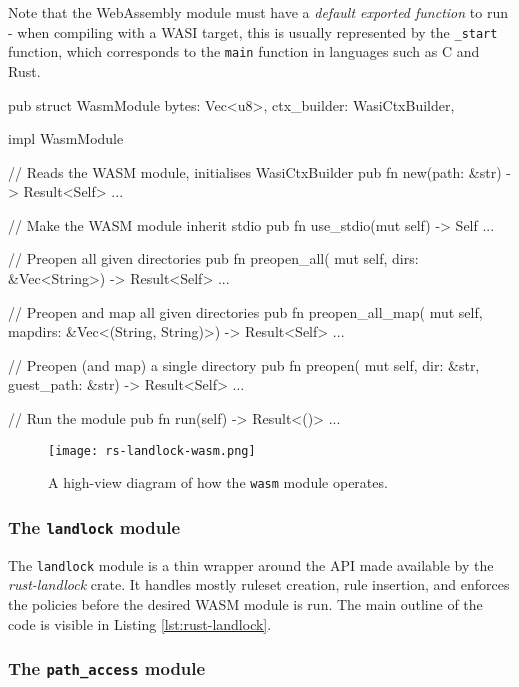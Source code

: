 Note that the WebAssembly module must have a \textit{default exported function} to run - when compiling with a WASI target,
this is usually represented by the \texttt{\_start} function, which corresponds to the \texttt{main} function in languages
such as C and Rust.

\vspace*{0.5cm}

\begin{code}[language=Rust, caption=The outline of the \texttt{wasm} module., label=lst:wasm-module-outline]
pub struct WasmModule {
  bytes: Vec<u8>, ctx_builder: WasiCtxBuilder,
}

impl WasmModule {
  // Reads the WASM module, initialises WasiCtxBuilder
  pub fn new(path: &str) -> Result<Self> {...}

  // Make the WASM module inherit stdio
  pub fn use_stdio(mut self) -> Self {...}

  // Preopen all given directories
  pub fn preopen_all(
    mut self,
    dirs: &Vec<String>) -> Result<Self> {...}
  
  // Preopen and map all given directories
  pub fn preopen_all_map(
    mut self,
    mapdirs: &Vec<(String, String)>) -> Result<Self> {...}

  // Preopen (and map) a single directory
  pub fn preopen(
    mut self,
    dir: &str, guest_path: &str) -> Result<Self> {...}
  
  // Run the module
  pub fn run(self) -> Result<()> {...}
}  
\end{code}

\begin{figure}[ht]
  \centering
  \texttt{[image: rs-landlock-wasm.png]}
  \caption{A high-view diagram of how the \texttt{wasm} module operates.}
  \label{fig:wasm-module}
\end{figure}

\subsubsection{The \texttt{landlock} module}

The \texttt{landlock} module is a thin wrapper around the API made available by the \textit{rust-landlock} crate.
It handles mostly ruleset creation, rule insertion, and enforces the policies before the desired WASM module is run.
The main outline of the code is visible in Listing \ref{lst:rust-landlock}.

\subsubsection{The \texttt{path\_access} module}

